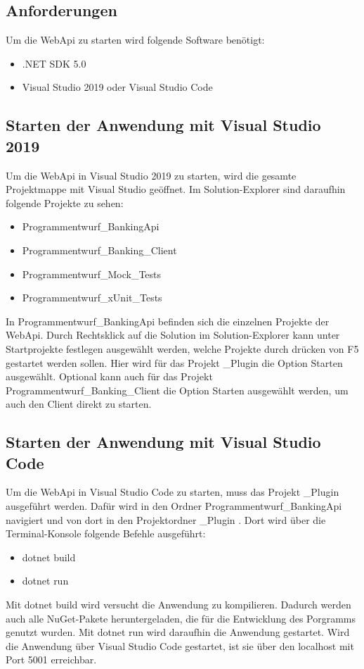 \subsection{Anforderungen}
Um die WebApi zu starten wird folgende Software benötigt:
\begin{itemize}
    \item .NET SDK 5.0
    \item Visual Studio 2019 oder Visual Studio Code
\end{itemize}
\subsection{Starten der Anwendung mit Visual Studio 2019}
Um die WebApi in Visual Studio 2019 zu starten, wird die gesamte Projektmappe mit Visual Studio geöffnet. Im Solution-Explorer sind daraufhin folgende Projekte zu sehen:
\begin{itemize}
    \item Programmentwurf\_BankingApi
    \item Programmentwurf\_Banking\_Client
    \item Programmentwurf\_Mock\_Tests
    \item Programmentwurf\_xUnit\_Tests
\end{itemize}
In \glqq Programmentwurf\_BankingApi \grqq befinden sich die einzelnen Projekte der WebApi. Durch Rechtsklick auf die Solution im Solution-Explorer kann unter \glqq Startprojekte festlegen \grqq 
ausgewählt werden, welche Projekte durch drücken von F5 gestartet werden sollen. Hier wird für das Projekt \_Plugin \grqq die Option \glqq Starten \grqq ausgewählt. Optional kann auch 
für das Projekt \glqq Programmentwurf\_Banking\_Client \grqq die Option \glqq Starten \grqq ausgewählt werden, um auch den Client direkt zu starten.
\subsection{Starten der Anwendung mit Visual Studio Code}
Um die WebApi in Visual Studio Code zu starten, muss das Projekt \_Plugin \grqq ausgeführt werden. Dafür wird in den Ordner \glqq Programmentwurf\_BankingApi \grqq navigiert und von dort in 
den Projektordner \_Plugin \grqq . Dort wird über die Terminal-Konsole folgende Befehle ausgeführt:
\begin{itemize}
    \item dotnet build
    \item dotnet run
\end{itemize}
Mit \glqq dotnet \grqq build wird versucht die Anwendung zu kompilieren. Dadurch werden auch alle NuGet-Pakete heruntergeladen, die für die Entwicklung des Porgramms genutzt wurden.
\newline Mit \glqq dotnet run \grqq wird daraufhin die Anwendung gestartet. Wird die Anwendung über Visual Studio Code gestartet, ist sie über den localhost mit Port 5001 erreichbar.
